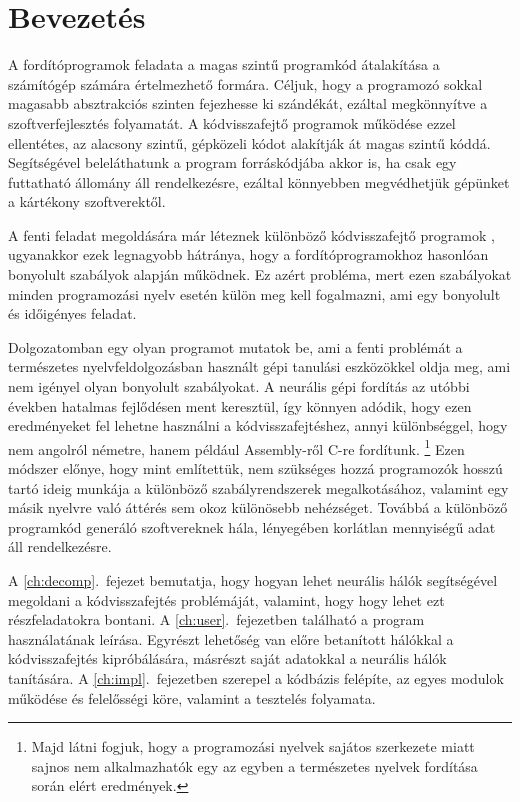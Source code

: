 \chapter{Bevezetés}
\label{ch:intro}

A fordítóprogramok feladata a magas szintű programkód átalakítása a számítógép számára értelmezhető formára. Céljuk, 
hogy a programozó sokkal magasabb absztrakciós szinten fejezhesse ki szándékát, ezáltal megkönnyítve a 
szoftverfejlesztés folyamatát. A kódvisszafejtő programok működése ezzel ellentétes, az alacsony szintű, gépközeli 
kódot alakítják át magas szintű kóddá. Segítségével beleláthatunk a program forráskódjába akkor is, ha csak egy 
futtatható állomány áll rendelkezésre, ezáltal könnyebben megvédhetjük gépünket a kártékony szoftverektől.

A fenti feladat megoldására már léteznek különböző kódvisszafejtő programok \cite{ghidra, binaryninja},
ugyanakkor ezek legnagyobb hátránya, hogy a fordítóprogramokhoz hasonlóan bonyolult szabályok
alapján működnek. Ez azért probléma, mert ezen szabályokat minden programozási nyelv esetén
külön meg kell fogalmazni, ami egy bonyolult és időigényes feladat.

Dolgozatomban egy olyan programot mutatok be, ami a fenti problémát a természetes
nyelvfeldolgozásban használt gépi tanulási eszközökkel oldja meg, ami nem igényel olyan bonyolult szabályokat. A neurális gépi fordítás
az utóbbi években hatalmas fejlődésen ment keresztül\cite{bert}, így könnyen adódik, hogy ezen
eredményeket fel lehetne használni a kódvisszafejtéshez, annyi különbséggel, hogy nem
angolról németre, hanem például Assembly-ről C-re fordítunk.
\footnote{Majd látni fogjuk, hogy a programozási nyelvek sajátos szerkezete miatt sajnos
nem alkalmazhatók egy az egyben a természetes nyelvek fordítása során elért eredmények.}
Ezen módszer előnye, hogy mint említettük, nem szükséges hozzá programozók hosszú tartó ideig munkája a különböző
szabályrendszerek megalkotásához, valamint egy másik nyelvre való áttérés sem okoz
különösebb nehézséget. Továbbá a különböző programkód generáló szoftvereknek
hála, lényegében korlátlan mennyiségű adat áll rendelkezésre.

A \ref{ch:decomp}.~fejezet bemutatja, hogy hogyan lehet neurális hálók segítségével megoldani
a kódvisszafejtés problémáját, valamint, hogy hogy lehet ezt részfeladatokra bontani.
A \ref{ch:user}.~fejezetben található a program használatának leírása. Egyrészt lehetőség van
előre betanított hálókkal a kódvisszafejtés kipróbálására, másrészt saját adatokkal a neurális
hálók tanítására.
A \ref{ch:impl}.~fejezetben szerepel a kódbázis felépíte, az egyes modulok működése és felelősségi köre,
valamint a tesztelés folyamata.

